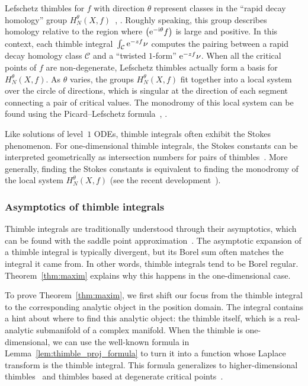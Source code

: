 \documentclass[pdftex]{sigma}
\let\Re\relax
\DeclareMathOperator{\Re}{Re}
\numberwithin{equation}{section}
\begin{document}
Lefschetz thimbles for $f$ with direction $\theta$ represent classes in the ``rapid decay homology'' group $H^\theta_N(X,f)$~\cite{pham}, \cite[Section~1.1]{fresan-notes}. Roughly speaking, this group describes homology relative to the region where $\Re\bigl({\rm e}^{-{\rm i}\theta} f\bigr)$ is large and positive. In this context, each thimble integral~$\int_{\mathcal{C}}{\rm e}^{-zf} \nu$
computes the pairing between a rapid decay homology class $\mathcal{C}$ and a ``twisted $1$-form'' ${\rm e}^{-zf} \nu$. When all the critical points of $f$ are non-degenerate, Lefschetz thimbles actually form a basis for $H^\theta_N(X,f)$. As $\theta$ varies, the groups $H^\theta_N(X,f)$ fit together into a local system over the circle of directions, which is singular at the direction of each segment connecting a pair of critical values. The monodromy of this local system can be found using the Picard--Lefschetz formula~\cite[Section~1]{Arnold}, \cite[2\`{e}me Partie, Section~3.3]{pham}.

Like solutions of level~$1$ ODEs, thimble integrals often exhibit the Stokes phenomenon. For one-dimensional thimble integrals, the Stokes constants can be interpreted geometrically as intersection numbers for pairs of thimbles~\cite{kontsevich2022analyticity}. More generally, finding the Stokes constants is equivalent to finding the monodromy of the local system $H^\theta_N(X,f)$ (see the recent development~\cite{kontsevich2024holomorphic}).
%
\subsubsection{Asymptotics of thimble integrals}
%
Thimble integrals are traditionally understood through their asymptotics, which can be found with the saddle point approximation~\cite{andersen2020resurgence,delabaere_dillinger_pham,delabaere-howls,Delabaere-Pham99,dingle1973asymptotic,Malgrange22,Pham83}. The asymptotic expansion of a thimble integral is typically divergent, but its Borel sum often matches the integral it came from. In other words, thimble integrals tend to be Borel regular. Theorem~\ref{thm:maxim} explains why this happens in the one-dimensional case.

To prove Theorem~\ref{thm:maxim}, we first shift our focus from the thimble integral to the corresponding analytic object in the position domain. The integral contains a hint about where to find this analytic object: the thimble itself, which is a real-analytic submanifold of a complex manifold. When the thimble is one-dimensional, we can use the well-known formula in Lemma~\ref{lem:thimble_proj_formula} to turn it into a function whose Laplace transform is the thimble integral. This formula generalizes to higher-dimensional thimbles~\cite{pham} and thimbles based at degenerate critical points~\cite[Section~1.2.2]{mistegard_phdthesis}.
%
\end{document}
